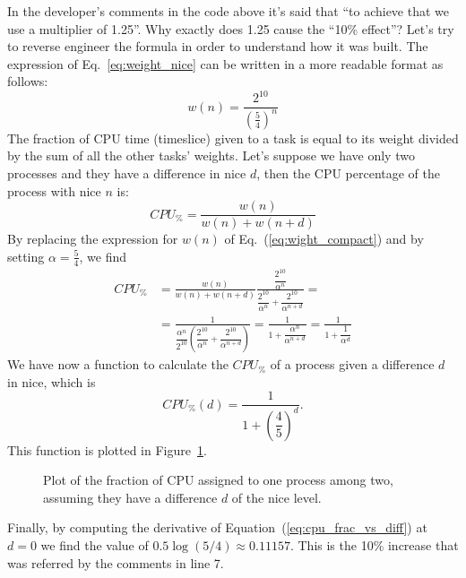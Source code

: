 In the developer's comments in the code above it's said that ``to achieve that we use a multiplier of 1.25''. Why exactly does 1.25 cause the ``10\% effect''? Let's try to reverse engineer the formula in order to understand how it was built. The expression of Eq.~\eqref{eq:weight_nice} can be written in a more readable format as follows:
\begin{equation}
    w(n) = \frac{2^{10}}{\left(\frac{5}{4}\right)^{n}}
    \label{eq:wight_compact}
\end{equation}
The fraction of CPU time (timeslice) given to a task is equal to its weight divided by the sum of all the other tasks' weights. Let's suppose we have only two processes and they have a difference in nice $d$, then the CPU percentage of the process with nice $n$ is:
\begin{equation}
    CPU_\% = \frac{w(n)}{w(n)+w(n+d)}
\end{equation}
By replacing the expression for $w(n)$ of Eq.~(\ref{eq:wight_compact}) and by setting $\alpha=\frac{5}{4}$, we find
\begin{align*}
    CPU_\% &=\frac{w(n)}{w(n)+w(n+d)} 
    \frac{\dfrac{2^{10}}{\alpha^{n}}}{\dfrac{2^{10}}{\alpha^{n}}+\dfrac{2^{10}}{\alpha^{n+d}}} =\\
    &=\frac{1}{\dfrac{\alpha^{n}}{2^{10}} \left(\dfrac{2^{10}}{\alpha^{n}}+\dfrac{2^{10}}{\alpha^{n+d}}\right)} =
    \frac{1}{1+\dfrac{\alpha^{n}}{\alpha^{n+d}}} =
    \frac{1}{1+\dfrac{1}{\alpha^{d}}}
\end{align*}
We have now a function to calculate the $CPU_\%$ of a process given a difference $d$ in nice, which is
\begin{equation}
    CPU_\%(d)=\frac{1}{1+\left(\dfrac{4}{5}\right)^{d}}.
    \label{eq:cpu_frac_vs_diff}
\end{equation}
This function is plotted in Figure~\ref{fig:plot_cpu}.
\begin{figure}[htb]
\centering
{}
\label{fig:plot_cpu}
\caption{Plot of the fraction of CPU assigned to one process among two, assuming they have a difference $d$ of the nice level.}
\end{figure}
Finally, by computing the derivative of Equation~(\ref{eq:cpu_frac_vs_diff}) at $d=0$ we find the value of $0.5\log(5/4)\approx 0.11157$. This is the 10\% increase that was referred by the comments in line 7. 


